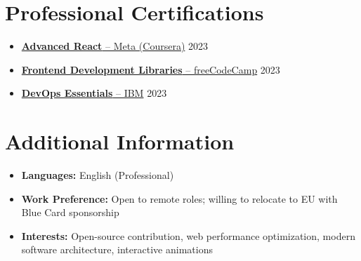 \documentclass[11pt]{article}
\begin{document}
\section{Professional Certifications}
\begin{itemize}
\item \href{https://www.coursera.org/account/accomplishments/verify/QC73X86DWCRK}{\textbf{Advanced React} -- Meta (Coursera)} \hfill 2023
\item \href{https://www.freecodecamp.org/certification/fcc36860a3c-366f-4e05-8655-9eeeba048998/front-end-development-libraries}{\textbf{Frontend Development Libraries} -- freeCodeCamp} \hfill 2023
\item \href{https://www.credly.com/badges/41de71d0-506d-4fc4-98b8-3d72b7d4fd44/linked_in_profile}{\textbf{DevOps Essentials} -- IBM} \hfill 2023
\end{itemize}

\section{Additional Information}
\begin{itemize}
\item \textbf{Languages:} English (Professional)
\item \textbf{Work Preference:} Open to remote roles; willing to relocate to EU with Blue Card sponsorship
\item \textbf{Interests:} Open-source contribution, web performance optimization, modern software architecture, interactive animations
\end{itemize}
\end{document}
